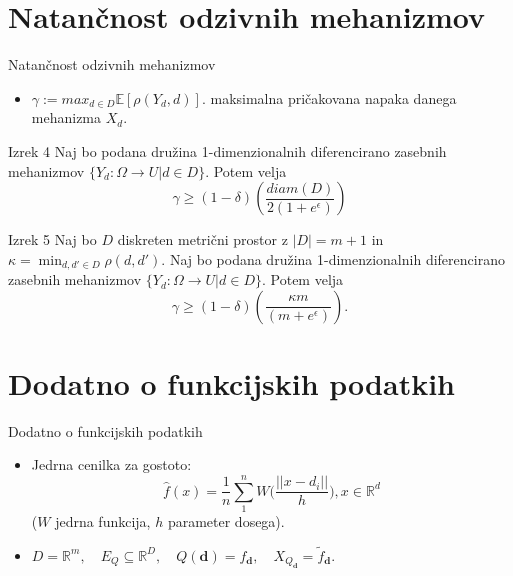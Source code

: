 \documentclass{beamer}
\begin{document}
\section{Natančnost odzivnih mehanizmov}
\begin{frame}{Natančnost odzivnih mehanizmov}
\begin{itemize}
\item $\gamma := max_{d\in D}\mathbb{E}[\rho(Y_d,d)].$ maksimalna pričakovana napaka danega mehanizma $X_d$.
\end{itemize}
\begin{block}{Izrek 4}
Naj bo podana družina 1-dimenzionalnih diferencirano zasebnih mehanizmov $\{ Y_d: \Omega \rightarrow U | d \in D\}$. Potem velja $$\gamma  \geq (1-\delta)(\frac{diam(D)}{2(1+e^\epsilon)})$$
\end{block}
\begin{block}{Izrek 5}
Naj bo $D$ diskreten metrični prostor z $|D| = m + 1$ in $\kappa = \min_{d, d' \in D} \rho(d,d')$. Naj bo podana družina 1-dimenzionalnih diferencirano zasebnih mehanizmov $\{ Y_d: \Omega \rightarrow U | d \in D\}$. Potem velja $$\gamma  \geq (1-\delta)(\frac{\kappa m}{(m+e^\epsilon)}).$$
\end{block}
\end{frame}

\section{Dodatno o funkcijskih podatkih}

\begin{frame}{Dodatno o funkcijskih podatkih}
\begin{itemize}
\item Jedrna cenilka za gostoto:
$$
\hat{f}(x)=\frac{1}{n}\sum_{1}^{n}W\Big(\frac{||x-d_i||}{h}\Big), x \in \mathbb{R}^d
$$
($W$ jedrna funkcija, $h$ parameter dosega).
\item $D = \mathbb{R}^m, \quad E_Q \subseteq \mathbb{R}^D, \quad Q(\textbf{d}) = f_{\textbf{d}}, \quad X_{Q_{\textbf{d}}} = \tilde{f}_{\textbf{d}}.$
\end{itemize}
\end{frame}
\end{document}
